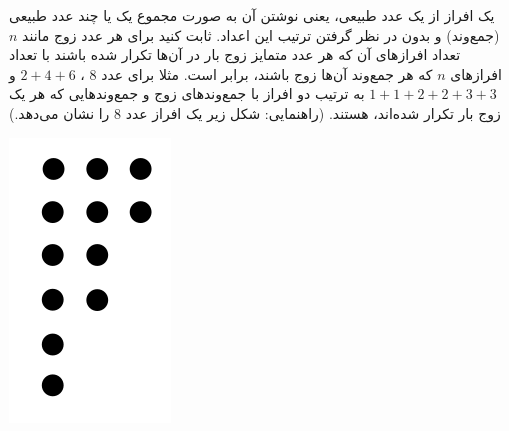 \EXERCISE
یک افراز از یک عدد طبیعی، یعنی نوشتن آن به صورت مجموع یک یا چند عدد طبیعی (جمع‌وند) و بدون در نظر گرفتن ترتیب این اعداد. ثابت کنید برای هر عدد زوج مانند
$n$
تعداد افرازهای آن که هر عدد متمایز زوج بار در آن‌ها تکرار شده باشند با تعداد افرازهای
$n$
که هر جمع‌وند آن‌ها زوج باشند، برابر است. مثلا برای عدد
$8$
،
$2 + 4 + 6$
و
$1 + 1 + 2 + 2 + 3 + 3$
به ترتیب دو افراز با جمع‌وندهای زوج و جمع‌وندهایی که هر یک زوج بار تکرار شده‌اند، هستند. (راهنمایی: شکل زیر یک افراز عدد
$8$
را نشان می‌دهد.)
    \begin{center}
     	\includegraphics[scale=0.2]{./10.png}
    \end{center}